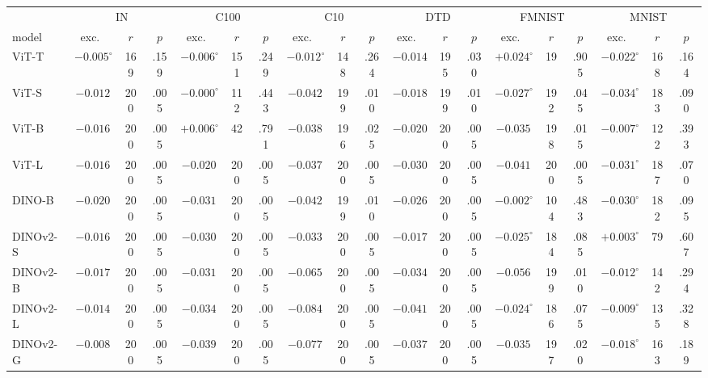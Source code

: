 \begin{table}[H]
\centering
\scriptsize
\setlength{\tabcolsep}{1.4pt}
\begin{tabular}{lcccccccccccccccccc}
\toprule
 & \multicolumn{3}{c}{IN} & \multicolumn{3}{c}{C100} & \multicolumn{3}{c}{C10} & \multicolumn{3}{c}{DTD} & \multicolumn{3}{c}{FMNIST} & \multicolumn{3}{c}{MNIST} \\
model & exc.\ & $r$ & $p$ & exc.\ & $r$ & $p$ & exc.\ & $r$ & $p$ & exc.\ & $r$ & $p$ & exc.\ & $r$ & $p$ & exc.\ & $r$ & $p$ \\
\midrule
ViT-T & $-0.005^{\circ}$ & 169 & .159 & $-0.006^{\circ}$ & 151 & .249 & $-0.012^{\circ}$ & 148 & .264 & $-0.014$ & 195 & .030 & $+0.024^{\circ}$ & 19 & .905 & $-0.022^{\circ}$ & 168 & .164 \\
ViT-S & $-0.012$ & 200 & .005 & $-0.000^{\circ}$ & 112 & .443 & $-0.042$ & 199 & .010 & $-0.018$ & 199 & .010 & $-0.027^{\circ}$ & 192 & .045 & $-0.034^{\circ}$ & 183 & .090 \\
ViT-B & $-0.016$ & 200 & .005 & $+0.006^{\circ}$ & 42 & .791 & $-0.038$ & 196 & .025 & $-0.020$ & 200 & .005 & $-0.035$ & 198 & .015 & $-0.007^{\circ}$ & 122 & .393 \\
ViT-L & $-0.016$ & 200 & .005 & $-0.020$ & 200 & .005 & $-0.037$ & 200 & .005 & $-0.030$ & 200 & .005 & $-0.041$ & 200 & .005 & $-0.031^{\circ}$ & 187 & .070 \\
\midrule
DINO-B & $-0.020$ & 200 & .005 & $-0.031$ & 200 & .005 & $-0.042$ & 199 & .010 & $-0.026$ & 200 & .005 & $-0.002^{\circ}$ & 104 & .483 & $-0.030^{\circ}$ & 182 & .095 \\
DINOv2-S & $-0.016$ & 200 & .005 & $-0.030$ & 200 & .005 & $-0.033$ & 200 & .005 & $-0.017$ & 200 & .005 & $-0.025^{\circ}$ & 184 & .085 & $+0.003^{\circ}$ & 79 & .607 \\
DINOv2-B & $-0.017$ & 200 & .005 & $-0.031$ & 200 & .005 & $-0.065$ & 200 & .005 & $-0.034$ & 200 & .005 & $-0.056$ & 199 & .010 & $-0.012^{\circ}$ & 142 & .294 \\
DINOv2-L & $-0.014$ & 200 & .005 & $-0.034$ & 200 & .005 & $-0.084$ & 200 & .005 & $-0.041$ & 200 & .005 & $-0.024^{\circ}$ & 186 & .075 & $-0.009^{\circ}$ & 135 & .328 \\
DINOv2-G & $-0.008$ & 200 & .005 & $-0.039$ & 200 & .005 & $-0.077$ & 200 & .005 & $-0.037$ & 200 & .005 & $-0.035$ & 197 & .020 & $-0.018^{\circ}$ & 163 & .189 \\

\end{tabular}
\end{table}
